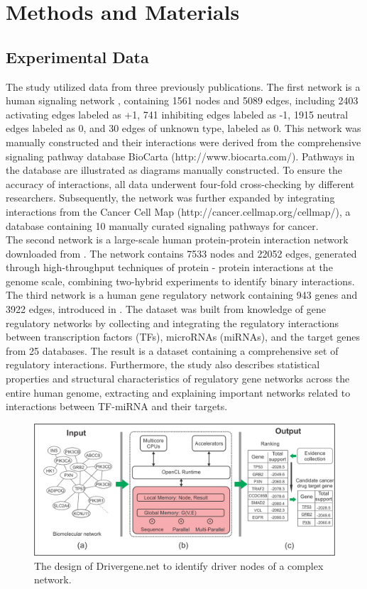 \documentclass[5p,,preprint,12pt]{elsarticle}
\begin{document}
\section{Methods and Materials}
\subsection{Experimental Data } 
The study utilized data from three previously publications. The first network is a human signaling network \cite{18}, containing 1561 nodes and 5089 edges, including 2403 activating edges labeled as +1, 741 inhibiting edges labeled as -1, 1915 neutral edges labeled as 0, and 30 edges of unknown type, labeled as 0. This network was manually constructed and their interactions were derived from the comprehensive signaling pathway database BioCarta (http://www.biocarta.com/). Pathways in the database are illustrated as diagrams manually constructed. To ensure the accuracy of interactions, all data underwent four-fold cross-checking by different researchers. Subsequently, the network was further expanded by integrating interactions from the Cancer Cell Map (http://cancer.cellmap.org/cellmap/), a database containing 10 manually curated signaling pathways for cancer. \\
The second network is a large-scale human protein-protein interaction network downloaded from \cite{19}. The network contains 7533 nodes and 22052 edges, generated through high-throughput techniques of protein - protein interactions at the genome scale, combining two-hybrid experiments to identify binary interactions. \\
The third network is a human gene regulatory network containing 943 genes and 3922 edges, introduced in \cite{20}. The dataset was built from knowledge of gene regulatory networks by collecting and integrating the regulatory interactions between transcription factors (TFs), microRNAs (miRNAs), and the target genes from 25 databases. The result is a dataset containing a comprehensive set of regulatory interactions. Furthermore, the study also describes statistical properties and structural characteristics of regulatory gene networks across the entire human genome, extracting and explaining important networks related to interactions between TF-miRNA and their targets. 

\begin{figure}[!ht]
	\centering 
	\includegraphics[scale=0.95]{images/fig1.png}
	\caption{The design of Drivergene.net to identify driver nodes of a complex network.}
	\label{figure-1}
\end{figure}
\end{document}
